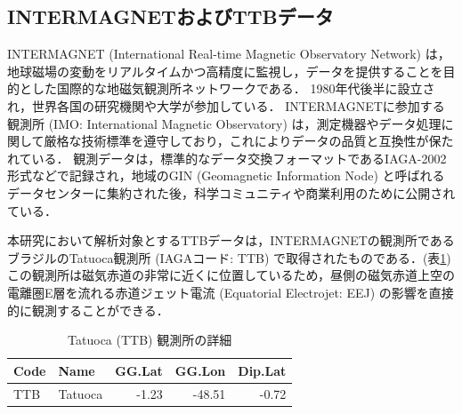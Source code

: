 \subsection{INTERMAGNETおよびTTBデータ}

INTERMAGNET (International Real-time Magnetic Observatory Network) は，地球磁場の変動をリアルタイムかつ高精度に監視し，データを提供することを目的とした国際的な地磁気観測所ネットワークである．
1980年代後半に設立され，世界各国の研究機関や大学が参加している．
INTERMAGNETに参加する観測所 (IMO: International Magnetic Observatory) は，測定機器やデータ処理に関して厳格な技術標準を遵守しており，これによりデータの品質と互換性が保たれている．
観測データは，標準的なデータ交換フォーマットであるIAGA-2002形式などで記録され，地域のGIN (Geomagnetic Information Node) と呼ばれるデータセンターに集約された後，科学コミュニティや商業利用のために公開されている．

本研究において解析対象とするTTBデータは，INTERMAGNETの観測所であるブラジルのTatuoca観測所 (IAGAコード: TTB) で取得されたものである．(表\ref{tab:ttb_station})
この観測所は磁気赤道の非常に近くに位置しているため，昼側の磁気赤道上空の電離圏E層を流れる赤道ジェット電流 (Equatorial Electrojet: EEJ) の影響を直接的に観測することができる．

\begin{table}[htbp]
  \centering
  \caption{Tatuoca (TTB) 観測所の詳細}
  \label{tab:ttb_station}
  \begin{tabular}{llrrr}
    \toprule
    Code & Name & GG.Lat & GG.Lon  & Dip.Lat \\
    \midrule
    TTB & Tatuoca & -1.23 & -48.51 & -0.72 \\
    \bottomrule
  \end{tabular}
\end{table}
